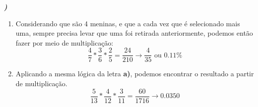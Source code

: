 \documentclass[12pt]{article}
\newcounter{instn}
\newcommand{\instnum}{\arabic{instn}}
\newcommand{\myline}[1]{
    \emph{\textbf{#1)}}
    \addtocounter{instn}{1}
}
\newenvironment{question}
 {
    \myline{\instnum} 
    }
    {
 }
\begin{document}

     \begin{question}
        \begin{enumerate}[label={\textbf{\alph*)}}]
            \item Considerando que são 4 meninas, e que a cada vez que é selecionado mais uma, sempre precisa 
            levar que uma foi retirada anteriormente, podemos então fazer por meio de multiplicação:
            \begin{equation}
                \frac{4}{7} * \frac{3}{6} * \frac{2}{5} = \frac{24}{210} \rightarrow \frac{4}{35} \text{  ou  } 0.11\%
            \end{equation}
            \item Aplicando a mesma lógica da letra \textbf{a)}, podemos encontrar o resultado a partir de multiplicação.
            \begin{equation}
                \frac{5}{13} * \frac{4}{12} * \frac{3}{11} = \frac{60}{1716} \rightarrow 0.0350
            \end{equation}
        \end{enumerate}
    \end{question}
\end{document}
